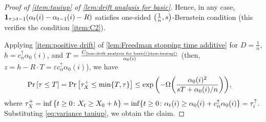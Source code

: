 \documentclass[letterpaper,11pt]{article}
\newcommand{\indicator}{\mathbf{1}}
\newcommand{\constrefs}[2]{C_{\mbox{\tiny\ref{#1}(\ref{#2})}}}
\newcommand{\calphaup}{c^{\uparrow}_\alpha}
\newcommand{\bounded}{D}
\newcommand{\variance}{s}
\newcommand{\tauiup}{\tau^{\uparrow}_i}
\newcommand{\drift}{R}
\newcommand{\tauxplus}{\tau_X^+}
\begin{document}
\begin{proof}[Proof of \cref{item:tauiup} of \cref{lem:drift analysis for basic}]
    Hence, in any case, $\indicator_{\tau>t-1}\qty(\alpha_t(i)-\alpha_{t-1}(i)-R)$ satisfies one-sided $\qty(\frac{1}{n}, \variance)$-Bernstein condition (this verifies the condition \ref{item:C2}).


    Applying \cref{item:positive drift} of \cref{lem:Freedman stopping time additive} for 
    $\bounded=\frac{1}{n}$, $h=\calphaup\alpha_0(i)$, and $T = \frac{\constrefs{lem:drift analysis for basic}{item:tauiup}}{ \alpha_0(i)}$ (then, $ z = h-\drift\cdot T = \varepsilon\calphaup\alpha_0(i) $), we have
    \begin{align*}
    \Pr\qty[\tau\leq T]
    &=\Pr\qty[\tauxplus\leq \min\{T,\tau\}]
    \le \exp\qty( -\Omega\qty(\frac{\alpha_0(i)^2}{ \variance T + \alpha_0(i)/n }) ),
    \end{align*}
    where $ \tauxplus = \inf\qty{ t\ge 0\colon X_t\ge X_0 + h } = \inf\{ t\ge 0\colon \alpha_t(i)\ge \alpha_0(i) + \calphaup\alpha_0(i) \}= \tauiup$.
    Substituting \cref{eq:variance tauiup}, we obtain the claim.
\end{proof}
\end{document}
